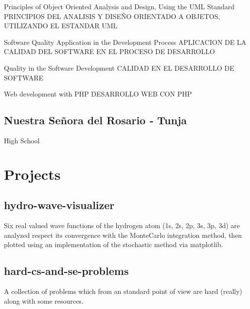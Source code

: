 \begin{multicols}{2}
\begin{cvlist}
		\cvitem
		{Principles of Object Oriented Analysis and Design, Using the UML Standard}
		{PRINCIPIOS DEL ANALISIS Y DISEÑO ORIENTADO A OBJETOS, UTILIZANDO EL ESTANDAR UML}
		
		\cvitem
		{Software Quality Application in the Development Process}
		{APLICACION DE LA CALIDAD DEL SOFTWARE EN EL PROCESO DE DESARROLLO}
		
		\cvitem
		{Quality in the Software Development}
		{CALIDAD EN EL DESARROLLO DE SOFTWARE}

		\cvitem
		{Web development with PHP}
		{DESARROLLO WEB CON PHP}

	\end{cvlist}
	\subsection{Nuestra Señora del Rosario ‑ Tunja}
	\begin{cvlist}
		\item High School
	\end{cvlist}
\end{multicols}

\separator

\section{Projects}
\reducespace
\renewcommand{\baselinestretch}{1.4}
\begin{multicols}{2}\raggedcolumns%
	
	\parbox{0.48\textwidth}{
		\subsection{hydro-wave-visualizer}
		Six real valued wave functions of the hydrogen atom 
		(1s, 2s, 2p, 3s, 3p, 3d) are analyzed respect its convergence
		with the MonteCarlo integration method, then plotted using an
		implementation of the stochastic method via matplotlib.\\
		
	}

	\parbox{0.48\textwidth}{
		\subsection{hard-cs-and-se-problems}
		A collection of problems which from 
		an standard point of view are hard (really) 
		along with some resources.\\
		
	}
\end{multicols}

